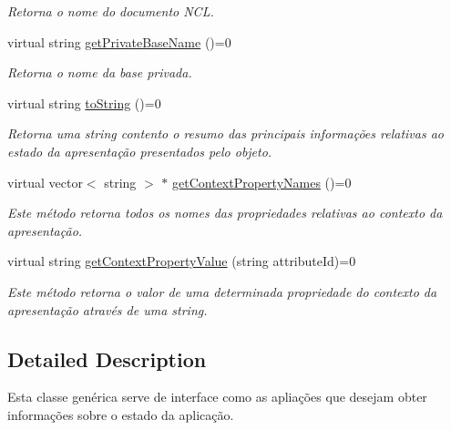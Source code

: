 \begin{DoxyCompactItemize}
\begin{DoxyCompactList}\small\item\em Retorna o nome do documento NCL. \item\end{DoxyCompactList}\item 
virtual string \hyperlink{classbr_1_1ufscar_1_1lince_1_1ginga_1_1wac_1_1state_1_1IPresentationState_a53e509fcb89622fa57b299526f96f728}{getPrivateBaseName} ()=0
\begin{DoxyCompactList}\small\item\em Retorna o nome da base privada. \item\end{DoxyCompactList}\item 
virtual string \hyperlink{classbr_1_1ufscar_1_1lince_1_1ginga_1_1wac_1_1state_1_1IPresentationState_a148a58eee3e6f96ae226f8360696d944}{toString} ()=0
\begin{DoxyCompactList}\small\item\em Retorna uma string contento o resumo das principais informações relativas ao estado da apresentação presentados pelo objeto. \item\end{DoxyCompactList}\item 
virtual vector$<$ string $>$ $\ast$ \hyperlink{classbr_1_1ufscar_1_1lince_1_1ginga_1_1wac_1_1state_1_1IPresentationState_a3ec5c1d54f31461e1a3e81a54fefaa87}{getContextPropertyNames} ()=0
\begin{DoxyCompactList}\small\item\em Este método retorna todos os nomes das propriedades relativas ao contexto da apresentação. \item\end{DoxyCompactList}\item 
virtual string \hyperlink{classbr_1_1ufscar_1_1lince_1_1ginga_1_1wac_1_1state_1_1IPresentationState_a3d16c8c6c2c90ef84313414072d953cf}{getContextPropertyValue} (string attributeId)=0
\begin{DoxyCompactList}\small\item\em Este método retorna o valor de uma determinada propriedade do contexto da apresentação através de uma string. \item\end{DoxyCompactList}\end{DoxyCompactItemize}


\subsection{Detailed Description}
Esta classe genérica serve de interface como as apliações que desejam obter informações sobre o estado da aplicação. 

